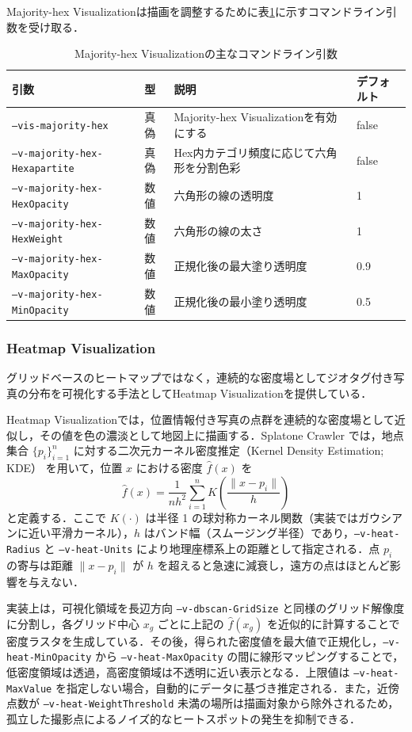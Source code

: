 Majority-hex Visualizationは描画を調整するために表\ref{tab:majority_hex_params}に示すコマンドライン引数を受け取る．

\begin{table}[h]
\centering\small
\caption{Majority-hex Visualizationの主なコマンドライン引数}
\label{tab:majority_hex_params}
\begin{tabular}{llll}
\hline
引数 & 型 & 説明 & デフォルト \\
\hline
  \texttt{--vis-majority-hex} & 真偽 & Majority-hex Visualizationを有効にする & false \\
  \texttt{--v-majority-hex-Hexapartite} & 真偽 & Hex内カテゴリ頻度に応じて六角形を分割色彩 & false \\
  \texttt{--v-majority-hex-HexOpacity} & 数値 & 六角形の線の透明度 & 1 \\
  \texttt{--v-majority-hex-HexWeight} & 数値 & 六角形の線の太さ & 1 \\
  \texttt{--v-majority-hex-MaxOpacity} & 数値 & 正規化後の最大塗り透明度 & 0.9 \\
  \texttt{--v-majority-hex-MinOpacity} & 数値 & 正規化後の最小塗り透明度 & 0.5 \\
\hline
\end{tabular}
\end{table}

\subsubsection{Heatmap Visualization}
グリッドベースのヒートマップではなく，連続的な密度場としてジオタグ付き写真の分布を可視化する手法としてHeatmap Visualizationを提供している．

Heatmap Visualizationでは，位置情報付き写真の点群を連続的な密度場として近似し，その値を色の濃淡として地図上に描画する．Splatone Crawler では，地点集合 $\{p_i\}_{i=1}^n$ に対する二次元カーネル密度推定（Kernel Density Estimation; KDE）\cite{silverman1986density} を用いて，位置 $x$ における密度 $\hat f(x)$ を
$$
  \hat f(x)
  = \frac{1}{n h^2} \sum_{i=1}^n K\left( \frac{\lVert x - p_i \rVert}{h} \right)
$$
と定義する．ここで $K(\cdot)$ は半径 1 の球対称カーネル関数（実装ではガウシアンに近い平滑カーネル），$h$ はバンド幅（スムージング半径）であり，\texttt{--v-heat-Radius} と \texttt{--v-heat-Units} により地理座標系上の距離として指定される．点 $p_i$ の寄与は距離 $\lVert x - p_i \rVert$ が $h$ を超えると急速に減衰し，遠方の点はほとんど影響を与えない．

実装上は，可視化領域を長辺方向 \texttt{--v-dbscan-GridSize} と同様のグリッド解像度に分割し，各グリッド中心 $x_g$ ごとに上記の $\hat f(x_g)$ を近似的に計算することで密度ラスタを生成している．その後，得られた密度値を最大値で正規化し，\texttt{--v-heat-MinOpacity} から \texttt{--v-heat-MaxOpacity} の間に線形マッピングすることで，低密度領域は透過，高密度領域は不透明に近い表示となる．上限値は \texttt{--v-heat-MaxValue} を指定しない場合，自動的にデータに基づき推定される．また，近傍点数が \texttt{--v-heat-WeightThreshold} 未満の場所は描画対象から除外されるため，孤立した撮影点によるノイズ的なヒートスポットの発生を抑制できる．

